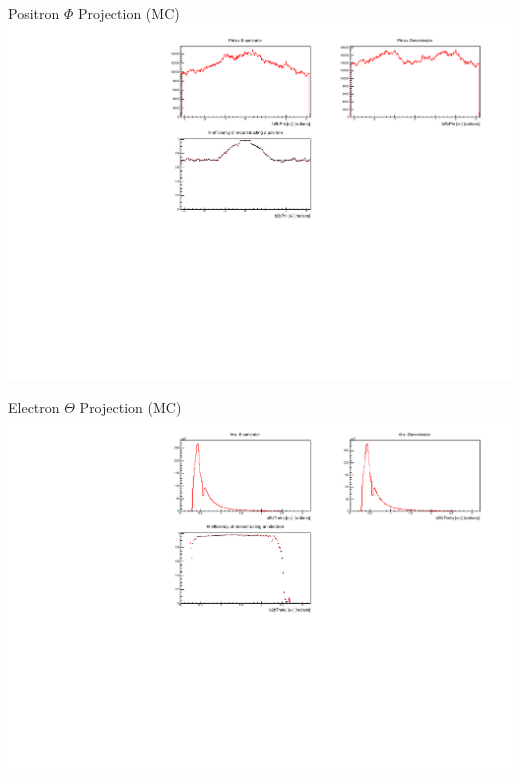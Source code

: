 \documentclass[10pt]{beamer}
\begin{document}
\begin{frame}{Positron $\Phi$ Projection (MC)}
	\centering
	\includegraphics[width=\textwidth]{Plots/Eff/epPhiPro}
\end{frame}


\begin{frame}{Electron $\Theta$ Projection (MC)}
	\centering
	\includegraphics[width=\textwidth]{Plots/Eff/emThetaPro}
\end{frame}
\end{document}
